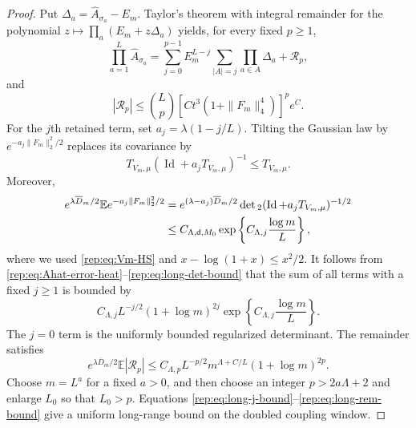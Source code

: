 \documentclass[11pt,reqno]{amsart}
\numberwithin{equation}{section}
\theoremstyle{plain}
\theoremstyle{definition}
\renewcommand{\d}{\mathsf d}
\newcommand{\E}{\mathbb E}
\newcommand{\Id}{\operatorname{Id}}
\begin{document}
\begin{proof}
Put $\Delta_a=\widehat A_{\sigma_a}-E_m$.  Taylor's theorem with integral remainder for the polynomial $z\mapsto\prod_a(E_m+z\Delta_a)$ yields, for every fixed $p\ge1$,
\begin{equation}\label{rep:eq:long-product-expansion}
 \prod_{a=1}^L\widehat A_{\sigma_a}
 =\sum_{j=0}^{p-1}E_m^{L-j}\sum_{|A|=j}\prod_{a\in A}\Delta_a
 +\mathcal R_p,
\end{equation}
and
\begin{equation}\label{rep:eq:long-product-remainder}
 |\mathcal R_p|
 \le\binom Lp\left[Ct^3(1+\|F_m\|_4^4)\right]^p e^C.
\end{equation}
For the $j$th retained term, set $a_j=\lambda(1-j/L)$.  Tilting the Gaussian law by $e^{-a_j\|F_m\|_2^2/2}$ replaces its covariance by
\begin{equation}\label{rep:eq:long-tilted-covariance}
 T_{V_m,\mu}(\Id+a_jT_{V_m,\mu})^{-1}\le T_{V_m,\mu}.
\end{equation}
Moreover,
\begin{align}
 e^{\lambda\overline D_m/2}
 \E e^{-a_j\|F_m\|_2^2/2}
 &=e^{(\lambda-a_j)\overline D_m/2}
 \det{}_2(\Id+a_jT_{V_m,\mu})^{-1/2}\notag\\
 &\le C_{\Lambda,\d,M_0}
 \exp\left\{C_{\Lambda,j}\frac{\log m}{L}\right\},
 \label{rep:eq:long-det-bound}
\end{align}
where we used \eqref{rep:eq:Vm-HS} and $x-\log(1+x)\le x^2/2$.  It follows from \eqref{rep:eq:Ahat-error-heat}--\eqref{rep:eq:long-det-bound} that the sum of all terms with a fixed $j\ge1$ is bounded by
\begin{equation}\label{rep:eq:long-j-bound}
 C_{\Lambda,j}L^{-j/2}(1+\log m)^{2j}
 \exp\left\{C_{\Lambda,j}\frac{\log m}{L}\right\}.
\end{equation}
The $j=0$ term is the uniformly bounded regularized determinant.  The remainder satisfies
\begin{equation}\label{rep:eq:long-rem-bound}
 e^{\lambda\overline D_m/2}\E|\mathcal R_p|
 \le C_{\Lambda,p}L^{-p/2}m^{\Lambda+C/L}(1+\log m)^{2p}.
\end{equation}
Choose $m=L^a$ for a fixed $a>0$, and then choose an integer $p>2a\Lambda+2$ and enlarge $L_0$ so that $L_0>p$.  Equations \eqref{rep:eq:long-j-bound}--\eqref{rep:eq:long-rem-bound} give a uniform long-range bound on the doubled coupling window.


\end{proof}
\end{document}
